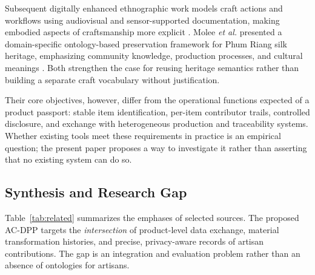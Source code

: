 \documentclass[conference]{IEEEtran}
\begin{document}
Subsequent digitally enhanced ethnographic work models craft actions and workflows using audiovisual and sensor-supported documentation, making embodied aspects of craftsmanship more explicit \cite{zabulis2025ethnography}. Molee \emph{et al.} presented a domain-specific ontology-based preservation framework for Phum Riang silk heritage, emphasizing community knowledge, production processes, and cultural meanings \cite{molee2026silk}. Both strengthen the case for reusing heritage semantics rather than building a separate craft vocabulary without justification.

Their core objectives, however, differ from the operational functions expected of a product passport: stable item identification, per-item contributor trails, controlled disclosure, and exchange with heterogeneous production and traceability systems. Whether existing tools meet these requirements in practice is an empirical question; the present paper proposes a way to investigate it rather than asserting that no existing system can do so.

\subsection{Synthesis and Research Gap}
Table~\ref{tab:related} summarizes the emphases of selected sources. The proposed AC-DPP targets the \emph{intersection} of product-level data exchange, material transformation histories, and precise, privacy-aware records of artisan contributions. The gap is an integration and evaluation problem rather than an absence of ontologies for artisans.
\end{document}
